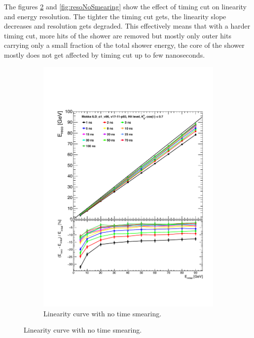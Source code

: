 The figures \ref{fig:linearityNoSmearing} and \ref{fig:resoNoSmearing} show the effect of timing cut on linearity and energy resolution. The tighter the timing cut gets, the linearity slope decreases and resolution gets degraded. This effectively means that with a harder timing cut, more hits of the shower are removed but mostly only outer hits carrying only a small fraction of the total shower energy, the core of the shower mostly does not get affected by timing cut up to few nanoseconds.

\begin{figure}[t]
  \centering
  \begin{subfigure}[t]{0.45\textwidth}
    \centering
    \includegraphics[width=1\linewidth]{chap6/fig_TimingILD/NoSmearing/Linearity_TimeCuts_noSmearing}
    \caption{Linearity curve with no time smearing.} \label{fig:linearityNoSmearing}
  \end{subfigure}

\end{figure}
